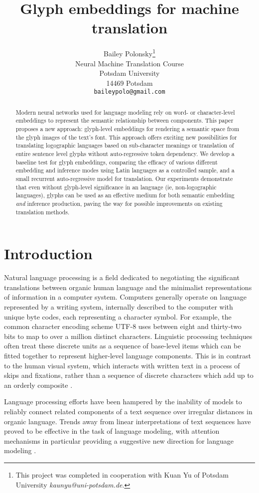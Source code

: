 \documentclass{article}
\title{Glyph embeddings for machine translation}
\author{
  Bailey Polonsky\thanks{This project was completed in cooperation with Kuan Yu of Potsdam University \emph{kaunyu@uni-potsdam.de}.} \\
  Neural Machine Translation Course\\
  Potsdam University\\
  14469 Potsdam \\
  \texttt{baileypolo@gmail.com} \\
}
\begin{document}
\maketitle
\begin{abstract}
Modern neural networks used for language modeling rely on word- or character-level embeddings to represent the semantic relationship between components. This paper proposes a new approach: glyph-level embeddings for rendering a semantic space from the glyph images of the text's font. This approach offers exciting new possibilities for translating logographic languages based on sub-character meanings or translation of entire sentence level glyphs without auto-regressive token dependency. We develop a baseline test for glyph embeddings, comparing the efficacy of various different embedding and inference modes using Latin languages as a controlled sample, and a small recurrent auto-regressive model for translation. Our experiments demonstrate that even without glyph-level significance in an language (ie, non-logographic languages), glyphs can be used as an effective medium for both semantic embedding \emph{and} inference production, paving the way for possible improvements on existing translation methods. 
\end{abstract}

\section{Introduction}
Natural language processing is a field dedicated to negotiating the significant translations between organic human language and the minimalist representations of information in a computer system. Computers generally operate on language represented by a writing system, internally described to the computer with unique byte codes, each representing a character symbol. For example, the common character encoding scheme UTF-8 uses between eight and thirty-two bits to map to over a million distinct characters. Linguistic processing techniques often treat these discrete units as a sequence of base-level items which can be fitted together to represent higher-level language components. This is in contrast to the human visual system, which interacts with written text in a process of skips and fixations, rather than a sequence of discrete characters which add up to an orderly composite \cite{eyefixation}.

Language processing efforts have been hampered by the inability of models to reliably connect related components of a text sequence over irregular distances in organic language. Trends away from linear interpretations of text sequences have proved to be effective in the task of language modeling, with attention mechanisms in particular providing a suggestive new direction for language modeling \cite{attnisalluneed}.
\end{document}

